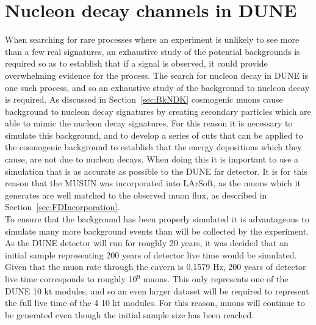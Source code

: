 \section{Nucleon decay channels in DUNE} \label{sec:DUNENDK} %
When searching for rare processes where an experiment is unlikely to see more than a few real signatures, an exhaustive study of the potential backgrounds is required so as to establish that if a signal is observed, it could provide overwhelming evidence for the process. The search for nucleon decay in DUNE is one such process, and so an exhaustive study of the background to nucleon decay is required. As discussed in Section~\ref{sec:BkNDK} cosmogenic muons cause background to nucleon decay signatures by creating secondary particles which are able to mimic the nucleon decay signatures. For this reason it is necessary to simulate this background, and to develop a series of cuts that can be applied to the cosmogenic background to establish that the energy depositions which they cause, are not due to nucleon decays. When doing this it is important to use a simulation that is as accurate as possible to the DUNE far detector. It is for this reason that the MUSUN was incorporated into LArSoft, as the muons which it generates are well matched to the observed muon flux, as described in Section~\ref{sec:FDIncorporation}. \\

To ensure that the background has been properly simulated it is advantageous to simulate many more background events than will be collected by the experiment. As the DUNE detector will run for roughly 20 years, it was decided that an initial sample representing 200 years of detector live time would be simulated. Given that the muon rate through the cavern is 0.1579 Hz, 200 years of detector live time corresponds to roughly 10$^9$ muons. This only represents one of the DUNE 10 kt modules, and so an even larger dataset will be required to represent the full live time of the 4 10 kt modules. For this reason, muons will continue to be generated even though the initial sample size has been reached. \\

